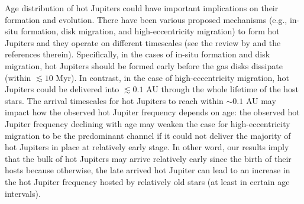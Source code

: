 \documentclass[twocolumn]{pnas-new}
\begin{document}
{Age distribution of hot Jupiters could have important implications on their formation and evolution. 
There have been various proposed mechanisms (e.g., in-situ formation, disk migration, and high-eccentricity migration) to form hot Jupiters and they operate on different timescales (see the review by \citep{2018ARA&A..56..175D} and the references therein).
Specifically, in the cases of in-situ formation and disk migration, hot Jupiters should be formed early before the gas disks dissipate (within $\lesssim 10$ Myr).
In contrast, in the case of high-eccentricity migration, hot Jupiters could be delivered into $\lesssim 0.1$ AU through the whole lifetime of the host stars.
The arrival timescales for hot Jupiters to reach within $\sim 0.1$ AU may impact how the observed hot Jupiter frequency depends on age: the observed hot Jupiter frequency declining with age may weaken the case for high-eccentricity migration to be the predominant channel if it could not deliver the majority of hot Jupiters in place at relatively early stage.
In other word, our results imply that the bulk of hot Jupiters may arrive relatively early since the birth of their hosts because otherwise, the late arrived hot Jupiter can lead to an increase in the hot Jupiter frequency hosted by relatively old stars (at least in certain age intervals).}
\end{document}
